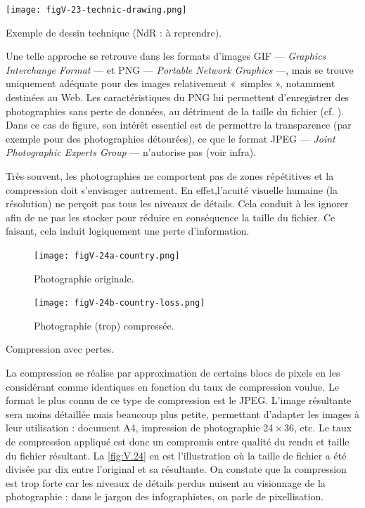 \begin{marginfigure}
\texttt{[image: figV-23-technic-drawing.png]}
\caption{\label{fig:V.23}Exemple de dessin technique (NdR : à reprendre).}
\end{marginfigure}

Une telle approche se retrouve dans les formats d'images GIF --- \textit{Graphics Interchange Format} --- et PNG --- \textit{Portable Network Graphics} ---, mais se trouve uniquement adéquate pour des images relativement «~simples », notamment destinées au Web. Les caractéristiques du PNG lui permettent d’enregistrer des photographies sans perte de données, au détriment de la taille du fichier (cf. \href{https://fr.wikipedia.org/wiki/Portable_Network_Graphics}{\faWikipediaW}). Dans ce cas de figure, son intérêt essentiel est de permettre la transparence (par exemple pour des photographies détourées), ce que le format JPEG --- \textit{Joint Photographic Experts Group} --- n'autorise pas (voir infra).

Très souvent, les photographies ne comportent pas de zones répétitives et la compression doit s'envisager autrement. En effet,\nopagebreak l'acuité visuelle humaine (la résolution) ne perçoit pas tous les niveaux de détails. Cela conduit à les ignorer afin de ne pas les stocker pour réduire en conséquence la taille du fichier. Ce faisant, cela induit logiquement une perte d'information. 

\begin{marginfigure}
\begin{subfigure}{\linewidth}
\texttt{[image: figV-24a-country.png]}
\caption{\label{fig:V.24a}Photographie originale.}
\end{subfigure}
\begin{subfigure}{\linewidth}
\texttt{[image: figV-24b-country-loss.png]}
\caption{\label{fig:V.24b}Photographie (trop) compressée.}
\end{subfigure}
\caption{\label{fig:V.24}Compression avec pertes.}
\end{marginfigure}

La compression se réalise par approximation de certains blocs de pixels en les considérant comme identiques en fonction du taux de compression voulue. Le format le plus connu de ce type de compression est le JPEG. L'image résultante sera moins détaillée mais beaucoup plus petite, permettant d'adapter les images à leur utilisation : document A4, impression de photographie 24\,$\times$\,36, etc. Le taux de compression appliqué est donc un compromis entre qualité du rendu et taille du fichier résultant. La \cref{fig:V.24} en est l'illustration où la taille de fichier a été divisée par dix entre l'original et sa résultante. On constate que la compression est trop forte car les niveaux de détails perdus nuisent au visionnage de la photographie : dans le jargon des infographistes, on parle de pixellisation.



